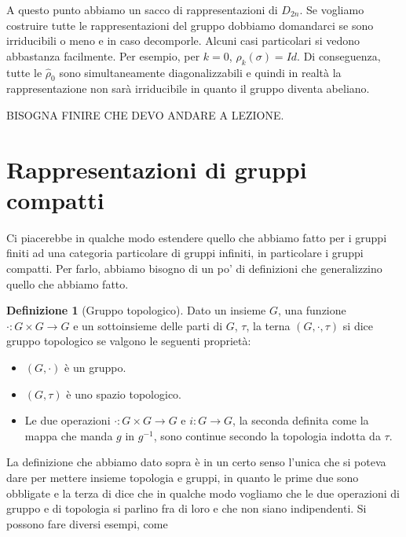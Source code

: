 \documentclass[11pt]{article}
\theoremstyle{plain}
\theoremstyle{definition}
\newtheorem{defn}{Definizione}[section]
\theoremstyle{remark}
\begin{document}
A questo punto abbiamo un sacco di rappresentazioni di $D_{2n}$. Se vogliamo costruire tutte le rappresentazioni del gruppo dobbiamo domandarci se sono irriducibili o meno e in caso decomporle. Alcuni casi particolari si vedono abbastanza facilmente. Per esempio, per $k=0$, $\hat \rho_k(\sigma) = Id$. Di conseguenza, tutte le $\hat \rho_0$ sono simultaneamente diagonalizzabili e quindi in realtà la rappresentazione non sarà irriducibile in quanto il gruppo diventa abeliano.



BISOGNA FINIRE CHE DEVO ANDARE A LEZIONE.






















\newpage
\section{Rappresentazioni di gruppi compatti}

Ci piacerebbe in qualche modo estendere quello che abbiamo fatto per i gruppi finiti ad una categoria particolare di gruppi infiniti, in particolare i gruppi compatti. Per farlo, abbiamo bisogno di un po' di definizioni che generalizzino quello che abbiamo fatto. 


\begin{defn}[Gruppo topologico] Dato un insieme $G$, una funzione $\cdot: G\times G \to G$ e un sottoinsieme delle parti di $G$, $\tau$, la terna $(G, \cdot, \tau)$ si dice gruppo topologico se valgono le seguenti proprietà:

\begin{itemize}
\item $(G, \cdot)$ è un gruppo.
\item $(G, \tau)$ è uno spazio topologico.
\item Le due operazioni $\cdot : G \times G \to G$ e $i: G \to G$, la seconda definita come la mappa che manda $g $ in $g^{-1}$,  sono continue secondo la topologia indotta da $\tau$.
\end{itemize}

\end{defn}


La definizione che abbiamo dato sopra è in un certo senso l'unica che si poteva dare per mettere insieme topologia e gruppi, in quanto le prime due sono obbligate e la terza di dice che in qualche modo vogliamo che le due operazioni di gruppo e di topologia si parlino fra di loro e che non siano indipendenti. Si possono fare diversi esempi, come
\end{document}
